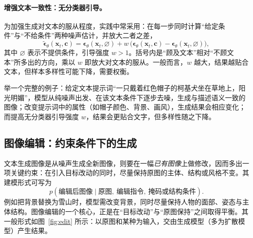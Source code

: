 \paragraph{增强文本一致性：无分类器引导。}为加强生成对文本的服从程度，实践中常采用\cite{cfg}：在每一步同时计算“给定条件”与“不给条件”两种噪声估计，并放大二者之差，
\begin{equation}
  \tilde{\boldsymbol{\epsilon}}_\theta(\mathbf{x}_t,\mathbf{c})=\boldsymbol{\epsilon}_\theta(\mathbf{x}_t,\varnothing)+w\,\big(\boldsymbol{\epsilon}_\theta(\mathbf{x}_t,\mathbf{c})-\boldsymbol{\epsilon}_\theta(\mathbf{x}_t,\varnothing)\big),
  \label{eq:cfg}
\end{equation}
其中 $\varnothing$ 表示不提供条件，引导强度 $w>1$。括号内是“顾及文本”相对“不顾文本”所多出的方向，乘以 $w$ 即放大对文本的服从。一般而言，$w$ 越大，结果越贴合文本，但样本多样性可能下降，需要权衡。

举一个完整的例子：给定文本提示词“一只戴着红色帽子的柯基犬坐在草地上，阳光明媚”，模型从纯噪声出发、在该文本条件下逐步去噪，生成与描述语义一致的图像；改变提示词中的属性（如帽子颜色、背景、画风），生成结果会相应变化；而提高无分类器引导强度 $w$，结果会更贴合文字，但多样性随之下降。

\subsection{图像编辑：约束条件下的生成}
\label{sub:edit}

文本生成图像是从噪声生成全新图像，则要在一幅\emph{已有图像}上做修改，因而多出一项关键约束：在引入目标改动的同时，尽量保持原图的主体、结构或风格不变。其建模形式可写为
\begin{equation}
  p(\text{编辑后图像}\mid \text{原图},\ \text{编辑指令},\ \text{掩码或结构条件}).
\end{equation}
例如把背景替换为雪山时，模型需改变背景，同时尽量保持人物的面部、姿态与主体结构。图像编辑的一个核心，正是在“目标改动”与“原图保持”之间取得平衡。其一般形式如图~\ref{fig:edit} 所示：以原图和某种为输入，交由生成模型（多为扩散模型）产生结果。


